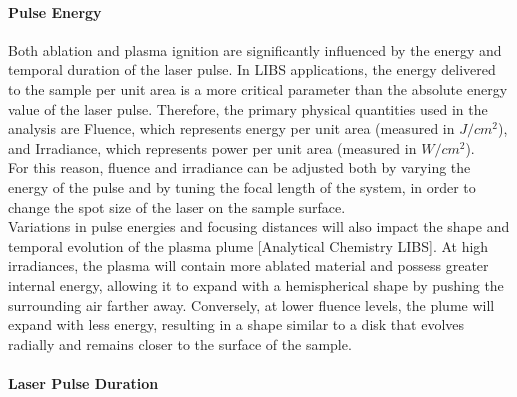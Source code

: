 \paragraph{Pulse Energy}
\label{par:pulse_energy_setup_component}
Both ablation and plasma ignition are significantly influenced by the energy and temporal duration of the laser pulse. In LIBS applications, the energy delivered to the sample per unit area is a more critical parameter than the absolute energy value of the laser pulse. Therefore, the primary physical quantities used in the analysis are Fluence, which represents energy per unit area (measured in $J/cm^2$), and Irradiance, which represents power per unit area (measured in $W/cm^2$).
\\
For this reason, fluence and irradiance can be adjusted both by varying the energy of the pulse and by tuning the focal length of the system, in order to change the spot size of the laser on the sample surface.
\\
Variations in pulse energies and focusing distances will also impact the shape and temporal evolution of the plasma plume [Analytical Chemistry LIBS]. At high irradiances, the plasma will contain more ablated material and possess greater internal energy, allowing it to expand with a hemispherical shape by pushing the surrounding air farther away. Conversely, at lower fluence levels, the plume will expand with less energy, resulting in a shape similar to a disk that evolves radially and remains closer to the surface of the sample.
\paragraph{Laser Pulse Duration}
\label{par:laser_pulse_duration_setup_component}

